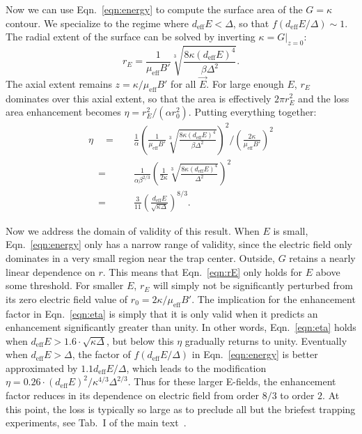 \documentclass[%
 reprint,
 amsmath,amssymb,
 aps,
prl,
]{revtex4-1}
\begin{document}
Now we can use Eqn.~\ref{eqn:energy} to compute the surface area of the $G=\kappa$ contour.
We specialize to the regime where $d_\text{eff}E<\Delta$, so that $f(d_\text{eff}E/\Delta)\sim 1$.
The radial extent of the surface can be solved by inverting $\kappa=G|_{z=0}$:
\begin{equation}
\label{eqn:rE}
r_E = \frac{1}{\mu_\text{eff}B'}\sqrt[3]{\frac{8\kappa(d_\text{eff}E)^4}{\beta\Delta^2}}.
\end{equation}
The axial extent remains $z=\kappa/\mu_\text{eff}B'$ for all $\vec{E}$.
For large enough $E$, $r_E$ dominates over this axial extent, so that the area is effectively $2\pi r_E^2$ and the loss area enhancement becomes $\eta = r_E^2/(\alpha r_0^2)$.
Putting everything together:
\begin{equation}
\begin{split}
\label{eqn:eta}
\eta\quad =&\quad \frac{1}{\alpha}\left(\frac{1}{\mu_\text{eff}B'}\sqrt[3]{\frac{8\kappa(d_\text{eff}E)^4}{\beta\Delta^2}}\right)^2\bigg/\left(\frac{2\kappa}{\mu_\text{eff}B'}\right)^2\\
\quad=&\quad \frac{1}{\alpha\beta^{2/3}}\left(\frac{1}{2\kappa}\sqrt[3]{\frac{8\kappa(d_\text{eff}E)^4}{\Delta^2}}\right)^2\\
\quad=&\quad\frac{3}{11}\left(\frac{d_\text{eff}E}{\sqrt{\kappa\Delta}}\right)^{8/3}.
\end{split}
\end{equation}

Now we address the domain of validity of this result.
When $E$ is small, Eqn.~\ref{eqn:energy} only has a narrow range of validity, since the electric field only dominates in a very small region near the trap center.
Outside, $G$ retains a nearly linear dependence on $r$.
This means that Eqn.~\ref{eqn:rE} only holds for $E$ above some threshold.
For smaller $E$, $r_E$ will simply not be significantly perturbed from its zero electric field value of $r_0=2\kappa/\mu_\text{eff}B'$.
The implication for the enhancement factor in Eqn.~\ref{eqn:eta} is simply that it is only valid when it predicts an enhancement significantly greater than unity.
In other words, Eqn.~\ref{eqn:eta} holds when $d_\text{eff}E>1.6\!\cdot\!\sqrt{\kappa\Delta}$, but below this $\eta$ gradually returns to unity.
Eventually when $d_\text{eff}E>\Delta$, the factor of $f(d_\text{eff}E/\Delta)$ in Eqn.~\ref{eqn:energy} is better approximated by $1.1d_\text{eff}E/\Delta$, which leads to the modification $\eta=0.26\!\cdot\!(d_\text{eff}E)^2/\kappa^{4/3}\Delta^{2/3}$.
Thus for these larger E-fields, the enhancement factor reduces in its dependence on electric field from order $8/3$ to order $2$.
At this point, the loss is typically so large as to preclude all but the briefest trapping experiments, see Tab.~I of the main text~\cite{smt}.
\end{document}

